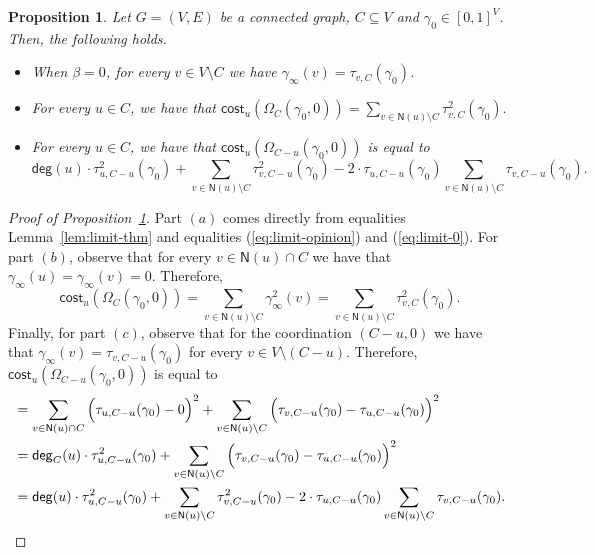 \documentclass[letterpaper,11pt]{article}
\newcommand{\nsf}{\mathsf{N}}
\newcommand{\cost}{\mathsf{cost}}
\newcommand{\degsf}{\mathsf{deg}}
\newtheorem{proposition}{Proposition}
\begin{document}
\begin{proposition}
\label{prop:properties}
Let $G=(V,E)$ be a connected graph, $C\subseteq V$ and $\gamma_0\in [0,1]^V$.
Then, the following holds.
\begin{itemize}
	\item[$(a)$] When $\beta=0$, for every $v\in V\setminus C$ we have $\gamma_{\infty}(v)=\tau_{v,C}(\gamma_0)$.
	\item[$(b)$]  For every $u\in C$, we have that 
 $\displaystyle \cost_u(\Omega_C(\gamma_0,0))=\sum_{v\in \nsf(u)\setminus C}\tau^2_{v,C}(\gamma_0).$
	\item[$(c)$]  For every $u\in C$, we have that $\cost_u(\Omega_{C-u}(\gamma_0,0))$ is equal to
\begin{equation*}
\degsf(u)\cdot \tau^2_{u,C-u}(\gamma_0)+\sum_{v\in \nsf(u)\setminus C}\tau^2_{v,C-u}(\gamma_0)-2\cdot \tau_{u,C-u}(\gamma_0)\sum_{v\in \nsf(u)\setminus C}\tau_{v,C-u}(\gamma_0).
\end{equation*}
\end{itemize}
\end{proposition}

\begin{proof}[Proof of Proposition~\ref{prop:properties}]
Part $(a)$ comes directly from equalities Lemma~\ref{lem:limit-thm} and equalities (\ref{eq:limit-opinion}) and (\ref{eq:limit-0}).
For part $(b)$, observe that for every $v\in \nsf(u)\cap C$ we have that $\gamma_{\infty}(u)=\gamma_{\infty}(v)=0$. 
Therefore,
\begin{equation*}
\cost_u(\Omega_C(\gamma_0,0))=\sum_{v\in \nsf(u)\setminus C}\gamma^2_{\infty}(v)=\sum_{v\in \nsf(u)\setminus C}\tau^2_{v,C}(\gamma_0).
\end{equation*}
Finally, for part $(c)$, observe that for the coordination $(C-u,0)$ we have that $\gamma_{\infty}(v)=\tau_{v,C-u}(\gamma_0)$ for every $v\in V\setminus (C-u)$.
Therefore, $\cost_u(\Omega_{C-u}(\gamma_0,0))$ is equal to 
\begin{align*}
&=\sum_{v\in \nsf(u)\cap C}\Big(\tau_{u,C-u}(\gamma_0)-0\Big)^2+\sum_{v\in \nsf(u)\setminus C}\Big(\tau_{v,C-u}(\gamma_0)-\tau_{u,C-u}(\gamma_0)\Big)^2\\
													&=\degsf_C(u)\cdot \tau^2_{u,C-u}(\gamma_0)+\sum_{v\in \nsf(u)\setminus C}\Big(\tau_{v,C-u}(\gamma_0)-\tau_{u,C-u}(\gamma_0)\Big)^2\\
													&=\degsf(u)\cdot \tau^2_{u,C-u}(\gamma_0)+\sum_{v\in \nsf(u)\setminus C}\tau^2_{v,C-u}(\gamma_0)-2\cdot \tau_{u,C-u}(\gamma_0)\sum_{v\in \nsf(u)\setminus C}\tau_{v,C-u}(\gamma_0).\qedhere
\end{align*}
\end{proof}
\end{document}
